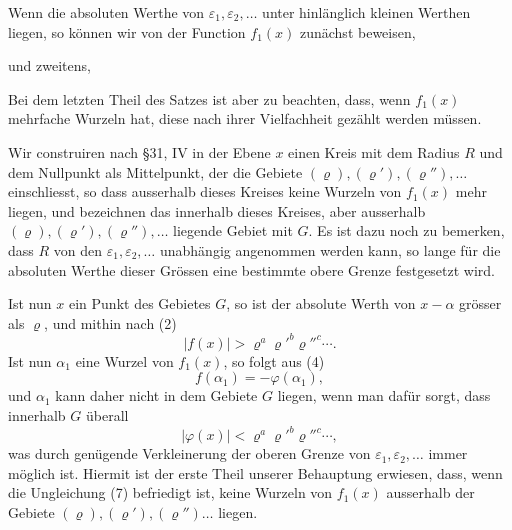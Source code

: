 
Wenn die absoluten Werthe von $\varepsilon_1,\varepsilon_2,
\ldots$ unter hinlänglich kleinen Werthen liegen, so können wir von der Function $f_1(x)$ zunächst beweisen,
\begin{center}
\end{center}
und zweitens,
\begin{center}
\end{center}
Bei dem letzten Theil des Satzes ist aber zu beachten, dass, wenn $f_1(x)$ mehrfache Wurzeln hat, diese nach ihrer Vielfachheit gezählt werden müssen.

Wir construiren nach \S 31, IV in der Ebene $x$ einen Kreis mit dem Radius $R$ und dem Nullpunkt als Mittelpunkt, der die Gebiete $(\varrho),(\varrho'),(\varrho''),\ldots$ einschliesst, so dass ausserhalb dieses Kreises keine Wurzeln von $f_1(x)$ mehr liegen, und bezeichnen das innerhalb dieses Kreises, aber ausserhalb $(\varrho),(\varrho'),(\varrho''),\ldots$ liegende Gebiet mit $G$. Es ist dazu noch zu bemerken, dass $R$ von den $\varepsilon_1,\varepsilon_2,
\ldots$ unabhängig angenommen werden kann, so lange für die absoluten Werthe dieser Grössen eine bestimmte obere Grenze festgesetzt wird.


Ist nun $x$ ein Punkt des Gebietes $G$, so ist der absolute Werth von $x-\alpha$ grösser als $\varrho$, und mithin nach (2)
\begin{equation}
 |f(x)|>\varrho^a\varrho'^b\varrho''^c\cdots .
\tag{5}
\end{equation}
Ist nun $\alpha_1$ eine Wurzel von $f_1(x)$, so folgt aus (4)
\begin{equation}
 f(\alpha_1)=-\varphi(\alpha_1),
\tag{6}
\end{equation}
und $\alpha_1$ kann daher nicht in dem Gebiete $G$ liegen, wenn man dafür sorgt, dass innerhalb $G$ überall
\begin{equation}
 |\varphi(x)|<\varrho^a\varrho'^b\varrho''^c\cdots,
\tag{7}
\end{equation}
was durch genügende Verkleinerung der oberen Grenze von $\varepsilon_1,\varepsilon_2,
\ldots$ immer möglich ist. Hiermit ist der erste Theil unserer Behauptung erwiesen, dass, wenn die Ungleichung (7) befriedigt ist, keine Wurzeln von $f_1(x)$ ausserhalb der Gebiete $(\varrho),(\varrho'),(\varrho'')\ldots$ liegen.

